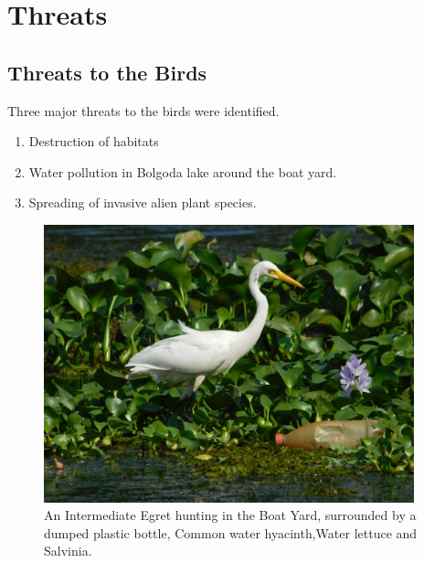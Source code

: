 \chapter{Threats}
\section{Threats to the Birds}
 Three major threats  to the birds were identified.
\begin{enumerate}
    \item Destruction of habitats
    \item Water pollution in Bolgoda lake around the boat yard.
    \item Spreading of invasive alien plant species.
\end{enumerate}
\begin{figure}[!htpb]
    \centering
    \includegraphics[width=0.955\textwidth]{Figures/threats.jpg}
    \caption[]{An Intermediate Egret hunting in the Boat Yard, surrounded by a dumped plastic bottle, Common water hyacinth,Water lettuce and Salvinia.}
    \label{fig:figure-01}
\end{figure}
